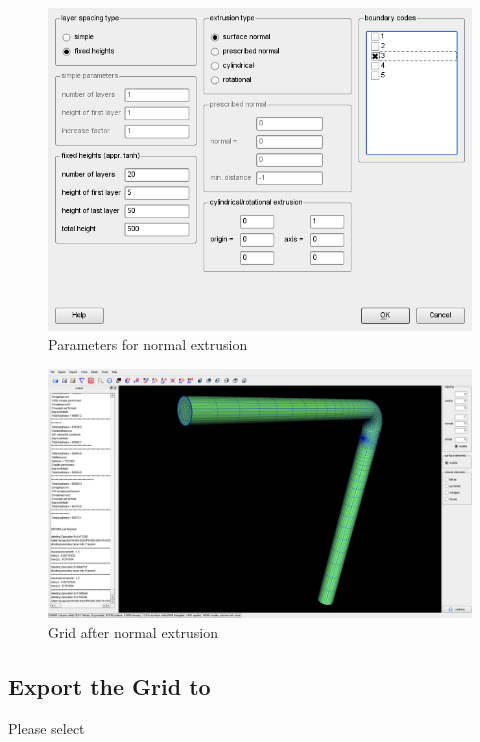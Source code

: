 \begin{figure}
  \begin{centering}
    \includegraphics[width=132mm]{figures/tutorials/T1/scr08}
    \par
  \end{centering}
  \caption{Parameters for normal extrusion}
  \label{fig:T1_scr08}
\end{figure}
\begin{figure}
  \begin{centering}
    \includegraphics[width=14cm]{figures/tutorials/T1/scr09}
    \par
  \end{centering}
  \caption{Grid after normal extrusion}
  \label{fig:T1_scr09}
\end{figure}
\clearpage

\subsection{Export the Grid to \foam}
Please select

